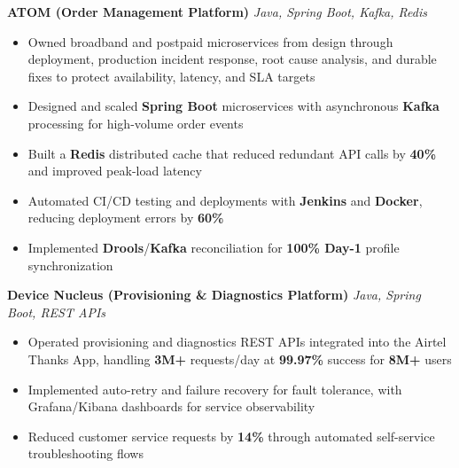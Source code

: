 \documentclass[letterpaper,11pt]{article}
\newcommand{\resumeItem}[1]{
  \item\small{{#1 \vspace{-2pt}}}
}
\newcommand{\resumeItemListStart}{\begin{itemize}}
\newcommand{\resumeItemListEnd}{\end{itemize}\vspace{-5pt}}
\begin{document}
      \vspace{4pt}
      \textbf{\small ATOM (Order Management Platform)} \hfill \textit{\small Java, Spring Boot, Kafka, Redis} \\
      \vspace{-2pt}
      \resumeItemListStart
        \resumeItem{Owned broadband and postpaid microservices from design through deployment, production incident response, root cause analysis, and durable fixes to protect availability, latency, and SLA targets} %
        \resumeItem{Designed and scaled \textbf{Spring Boot} microservices with asynchronous \textbf{Kafka} processing for high-volume order events}
        \resumeItem{Built a \textbf{Redis} distributed cache that reduced redundant API calls by \textbf{40\%} and improved peak-load latency}
        \resumeItem{Automated CI/CD testing and deployments with \textbf{Jenkins} and \textbf{Docker}, reducing deployment errors by \textbf{60\%}} %
        \resumeItem{Implemented \textbf{Drools}/\textbf{Kafka} reconciliation for \textbf{100\% Day-1} profile synchronization}
      \resumeItemListEnd

      \vspace{4pt}
      \textbf{\small Device Nucleus (Provisioning \& Diagnostics Platform)} \hfill \textit{\small Java, Spring Boot, REST APIs} \\
      \vspace{-2pt}
      \resumeItemListStart
        \resumeItem{Operated provisioning and diagnostics REST APIs integrated into the Airtel Thanks App, handling \textbf{3M+} requests/day at \textbf{99.97\%} success for \textbf{8M+} users}
        \resumeItem{Implemented auto-retry and failure recovery for fault tolerance, with Grafana/Kibana dashboards for service observability}
        \resumeItem{Reduced customer service requests by \textbf{14\%} through automated self-service troubleshooting flows}
      \resumeItemListEnd
\end{document}
